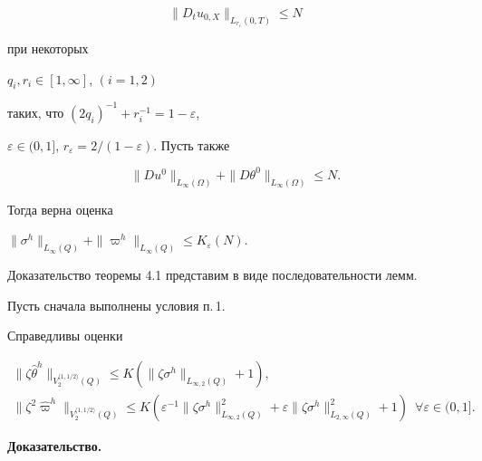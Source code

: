 \begin{thms}
\begin{equation}
\|D_tu_{0,X}\|_{L_{r_\varepsilon}(0,T)}\le N


\end{equation}


при некоторых


$q_i,r_i\in [1,\infty]$, $(i=1,2)$


таких, что $(2q_i)^{-1}+r_i^{-1}=1-\varepsilon$,


$\varepsilon\in (0,1]$, $r_{\varepsilon}=2/(1-\varepsilon)$. Пусть также


\begin{equation}


\|D u^0\|_{L_{\infty}(\Omega)}+\|D\theta^0\|_{L_{\infty}(\Omega)}\le N.


\end{equation}


Тогда верна оценка


$\|\sigma^h\|_{L_\infty(Q)}+\|\varpi^h\|_{L_\infty(Q)}


\le K_{\varepsilon}(N)$.


\end{thms}





Доказательство теоремы 4.1 представим в виде последовательности лемм.


Пусть сначала выполнены условия п.\,1.





\begin{lems} Справедливы оценки


\begin{gather}


\|\zeta\widehat\theta^h\|_{V_2^{\langle 1,1/2\rangle}(Q)}\le


K(\|\zeta\sigma^h\|_{L_{\infty,2}(Q)}+1),\\


\|\zeta^2\widehat\varpi^h\|_{V_2^{\langle 1,1/2\rangle}(Q)}


\le K(\varepsilon^{-1}\|\zeta\sigma^h\|^2_{L_{\infty,2}(Q)}+


\varepsilon\|\zeta\sigma^h\|^2_{L_{2,\infty}(Q)}+1)\ \;


\forall\varepsilon\in (0,1].


\end{gather}


\end{lems}





{\bf Доказательство.}


